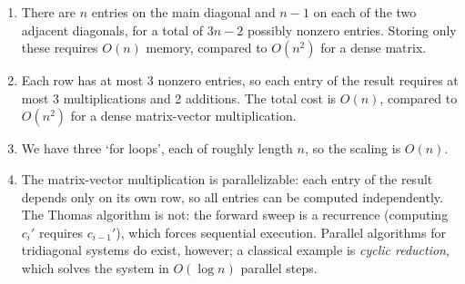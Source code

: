 \begin{solution}
  \begin{enumerate}[label=(\alph*)]
      \item There are $n$ entries on the main diagonal and $n-1$ on each of the two adjacent diagonals, for a total of $3n - 2$ possibly nonzero entries. Storing only these requires $O(n)$ memory, compared to $O(n^2)$ for a dense matrix.
      \item Each row has at most 3 nonzero entries, so each entry of the result requires at most 3 multiplications and 2 additions. The total cost is $O(n)$, compared to $O(n^2)$ for a dense matrix-vector multiplication.
      \item We have three `for loops', each of roughly length $n$, so the scaling is $O(n)$.
      \item The matrix-vector multiplication is parallelizable: each entry of the result depends only on its own row, so all entries can be computed independently. The Thomas algorithm is not: the forward sweep is a recurrence (computing $c_i'$ requires $c_{i-1}'$), which forces sequential execution. Parallel algorithms for tridiagonal systems do exist, however; a classical example is \emph{cyclic reduction}, which solves the system in $O(\log n)$ parallel steps.
  \end{enumerate}
\end{solution}


